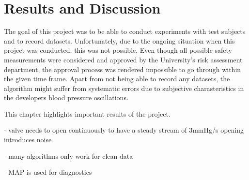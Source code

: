 \chapter{Results and Discussion}\label{cp:res}

The goal of this project was to be able to conduct experiments with test subjects and to record datasets. Unfortunately, due to the ongoing situation when this project was conducted, this was not possible. Even though all possible safety measurements were considered and approved by the University's risk assessment department, the approval process was rendered impossible to go through within the given time frame. Apart from not being able to record any datasets, the algorithm might suffer from systematic errors due to subjective charasteristics in the developers blood pressure oscillations. 


This chapter highlights important results of the project.


- valve needs to open continuously to have a steady stream of 3mmHg/s
  opening introduces noise

- many algorithms only work for clean data

- MAP is used for diagnostics 
